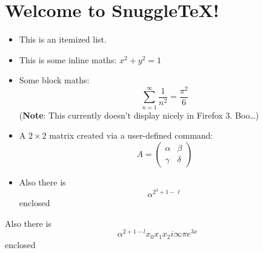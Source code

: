 \section*{Welcome to SnuggleTeX!}

\begin{itemize}
  \item This is an itemized list.

  \item This is some inline maths: $x^2+ y^2 = 1$

  \item Some block maths:
        \[ \sum_{n=1}^\infty \frac{1}{n^2} = \frac{\pi^2}{6} \]
        (\textbf{Note}: This currently doesn't display nicely in Firefox 3. Boo\ldots)

  \item A $2\times 2$ matrix created via a user-defined command:
        \newcommand{\mat}[4]{\left( \begin{array}{cc} #1 & #2 \\ #3 & #4 \end{array} \right)}
        \[ A = \mat{\alpha}{\beta}{\gamma}{\delta} \]

  \item Also there is $$ \alpha^{2^{3}+1-\ell} $$ enclosed

\end{itemize}

Also there is $$ \alpha^{2+1-l} x_{0} x_{1} x_2 i \infty \pi e^{3x}$$ enclosed

